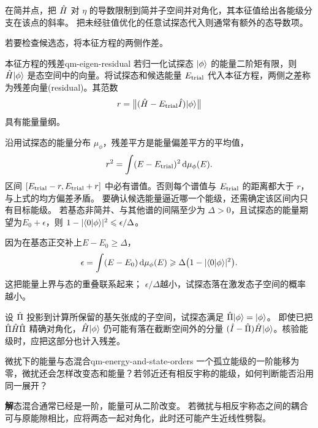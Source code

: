 在简并点，把 $\hat{H}$ 对 $\eta$ 的导数限制到简并子空间并对角化，其本征值给出各能级分支在该点的斜率。
把未经驻值优化的任意试探态代入则通常有额外的态导数项。

若要检查候选态，将本征方程的两侧作差。
\begin{definition}{本征方程的残差}{qm-eigen-residual}
    若归一化试探态 $\lvert\phi\rangle$ 的能量二阶矩有限，则 $\hat{H}\lvert\phi\rangle$ 是态空间中的向量。将试探态和候选能量 $E_{\mathrm{trial}}$ 代入本征方程，两侧之差称为残差向量(residual)。其范数
    \begin{equation}
        r = \bigl\lVert(\hat{H} - E_{\mathrm{trial}}\hat{I})\lvert\phi\rangle\bigr\rVert
    \end{equation}
    具有能量量纲。
\end{definition}
沿用试探态的能量分布 $\mu_\phi$，残差平方是能量偏差平方的平均值，
\begin{equation}\label{eq:qm-spectral-residual}
    r^2 = \int (E - E_{\mathrm{trial}})^2\mathop{}\!\mathrm{d}\mu_\phi(E).
\end{equation}
区间 $[E_{\mathrm{trial}} - r,E_{\mathrm{trial}} + r]$ 中必有谱值。否则每个谱值与 $E_{\mathrm{trial}}$ 的距离都大于 $r$，与上式的均方偏差矛盾。
要确认候选能量逼近哪一个能级，还需确定该区间内只有目标能级。
若基态非简并、与其他谱的间隔至少为 $\Delta > 0$，且试探态的能量期望为$E_0 + \epsilon$，则
$1 - \lvert\langle0\vert\phi\rangle\rvert^2 \leqslant \epsilon/\Delta$。

因为在基态正交补上$E - E_0 \geq \Delta$，
\begin{equation}
    \epsilon
    = \int(E - E_0)\mathop{}\!\mathrm{d}\mu_\phi(E)
    \geqslant \Delta\bigl(1 - \lvert\langle0\vert\phi\rangle\rvert^2\bigr).
\end{equation}
这把能量上界与态的重叠联系起来；
$\epsilon/\Delta$越小，试探态落在激发态子空间的概率越小。

\begin{remark}[截断基底中的残差]
    设 $\hat{\Pi}$ 投影到计算所保留的基矢张成的子空间，试探态满足 $\hat{\Pi}\lvert\phi\rangle = \lvert\phi\rangle$。
    即使已把 $\hat{\Pi}\hat{H}\hat{\Pi}$ 精确对角化，$\hat{H}\lvert\phi\rangle$ 仍可能有落在截断空间外的分量
    $(\hat{I} - \hat{\Pi})\hat{H}\lvert\phi\rangle$。核验能级时，应把这部分也计入残差。
\end{remark}

\begin{example}{微扰下的能量与态混合}{qm-energy-and-state-orders}
    一个孤立能级的一阶能移为零，微扰还会怎样改变态和能量？若邻近还有相反宇称的能级，如何判断能否沿用同一展开？

    \par\smallskip\textbf{解}\quad 态混合通常已经是一阶，能量可从二阶改变。
    若微扰与相反宇称态之间的耦合可与原能隙相比，应将两态一起对角化，此时还可能产生近线性劈裂。
\end{example}
